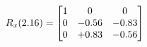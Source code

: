 \documentclass[preview]{standalone}
\begin{document}
\begin{align*}
\special{dvisvgm:raw <g id='unique000'>}R_{x}(2.16) = \begin{bmatrix}1 & 0 & 0 \\0 & -0.56 & -0.83 \\0 & +0.83 & -0.56\end{bmatrix}\special{dvisvgm:raw </g>}
\end{align*}
\end{document}

